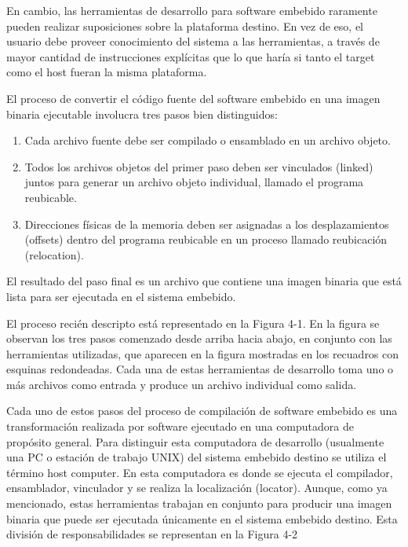 \documentclass[12pt]{article}
\begin{document}

En cambio, las herramientas de desarrollo para software embebido 
raramente pueden realizar suposiciones sobre la plataforma destino.
En vez de eso, el usuario debe proveer 
conocimiento del sistema a las herramientas, a través 
de mayor cantidad de instrucciones explícitas que lo que haría
si tanto el target como el host fueran la misma plataforma.

El proceso de convertir el código fuente del software embebido
en una imagen binaria ejecutable involucra tres pasos bien distinguidos:

\begin{enumerate}
\item Cada archivo fuente debe ser compilado o ensamblado en un archivo objeto.
\item Todos los archivos objetos del primer paso deben ser vinculados (linked)
juntos para generar un archivo objeto individual, llamado el programa reubicable.
\item Direcciones físicas de la memoria deben ser asignadas a los desplazamientos (offsets)
dentro del programa reubicable en un proceso llamado reubicación (relocation).
\end{enumerate}

El resultado del paso final es un archivo que contiene una imagen binaria
que está lista para ser ejecutada en el sistema embebido.

El proceso recién descripto está representado en la Figura 4-1.
En la figura se observan los tres pasos comenzado desde arriba hacia abajo,
en conjunto con las herramientas utilizadas, que aparecen en la figura
mostradas en los recuadros con esquinas redondeadas.
Cada una de estas herramientas de desarrollo toma uno o más archivos como entrada
y produce un archivo individual como salida. 

Cada uno de estos pasos del proceso de compilación de software embebido
es una transformación realizada por software ejecutado en una computadora
de propósito general. Para distinguir esta computadora de desarrollo (usualmente una 
PC o estación de trabajo UNIX) del sistema embebido destino se utiliza el término host computer.
En esta computadora es donde se ejecuta el compilador, ensamblador, vinculador y se realiza la localización (locator).
Aunque, como ya mencionado, estas herramientas trabajan en conjunto
para producir una imagen binaria que puede ser ejecutada
únicamente en el sistema embebido destino. Esta división de responsabilidades
se representan en la Figura 4-2
\end{document}
